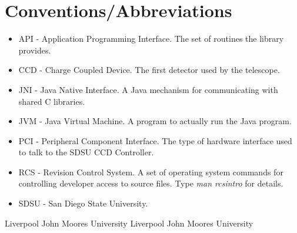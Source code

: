 \documentclass[10pt,a4paper]{article}
\begin{document}
\section{Conventions/Abbreviations}
\begin{itemize}
\item API - Application Programming Interface. The set of routines the library provides.
\item CCD - Charge Coupled Device. The first detector used by the telescope.
\item JNI - Java Native Interface. A Java mechanism for communicating with shared C libraries.
\item JVM - Java Virtual Machine. A program to actually run the Java program.
\item PCI - Peripheral Component Interface. The type of hardware interface used to talk to the SDSU CCD Controller.
\item RCS - Revision Control System. A set of operating system commands for controlling developer access to
source files. Type {\em man rcsintro} for details.
\item SDSU - San Diego State University.
\end{itemize}

\begin{thebibliography}{99}
Liverpool John Moores University 
Liverpool John Moores University 
\end{thebibliography}
\end{document}
